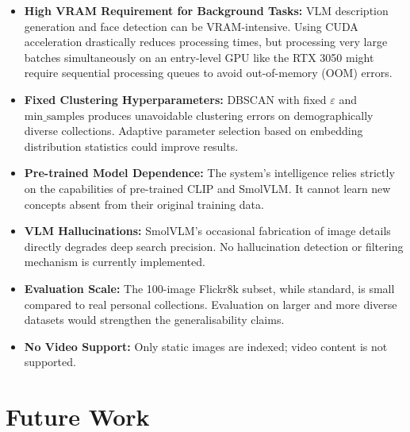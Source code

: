 \documentclass[12pt,a4paper,oneside]{report}
\begin{document}
\begin{itemize}[leftmargin=*]
  \item \textbf{High VRAM Requirement for Background Tasks:} VLM description generation and face detection can be VRAM-intensive. Using CUDA acceleration drastically reduces processing times, but processing very large batches simultaneously on an entry-level GPU like the RTX 3050 might require sequential processing queues to avoid out-of-memory (OOM) errors.
  \item \textbf{Fixed Clustering Hyperparameters:} DBSCAN with fixed $\varepsilon$ and $\text{min\_samples}$ produces unavoidable clustering errors on demographically diverse collections. Adaptive parameter selection based on embedding distribution statistics could improve results.
  \item \textbf{Pre-trained Model Dependence:} The system's intelligence relies strictly on the capabilities of pre-trained CLIP and SmolVLM. It cannot learn new concepts absent from their original training data.
  \item \textbf{VLM Hallucinations:} SmolVLM's occasional fabrication of image details directly degrades deep search precision. No hallucination detection or filtering mechanism is currently implemented.
  \item \textbf{Evaluation Scale:} The 100-image Flickr8k subset, while standard, is small compared to real personal collections. Evaluation on larger and more diverse datasets would strengthen the generalisability claims.
  \item \textbf{No Video Support:} Only static images are indexed; video content is not supported.
\end{itemize}

\section{Future Work}
\end{document}
